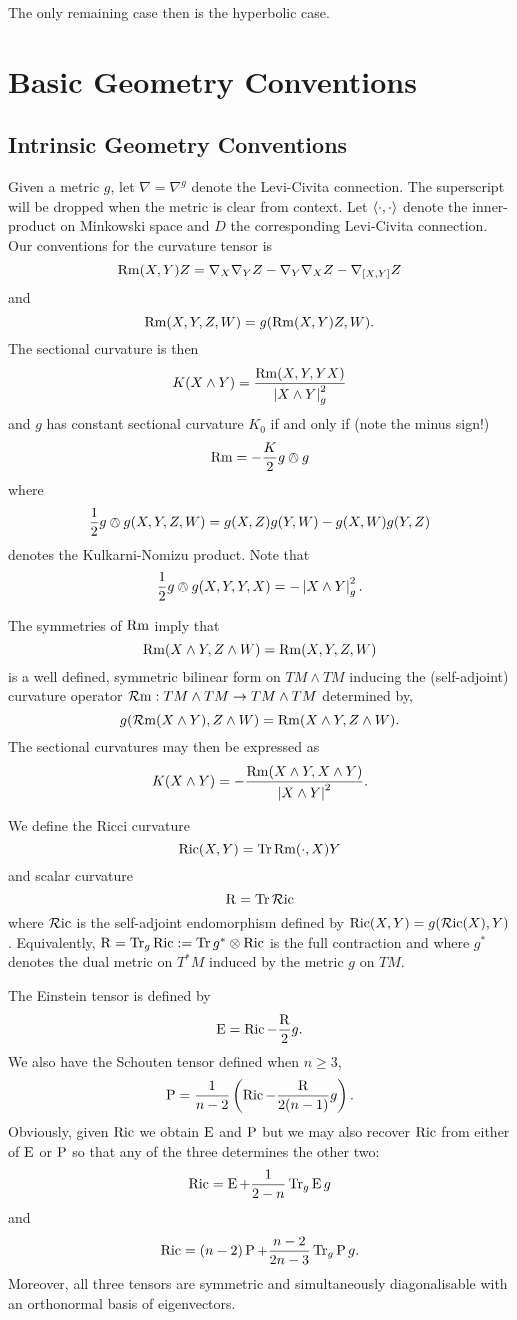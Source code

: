 \documentclass[a4paper, 12pt]{amsart}
\begin{document}
The only remaining case then is the hyperbolic case.

\section{Basic Geometry Conventions}
\label{sec:notation}
\subsection{Intrinsic Geometry Conventions}
\label{subsec:notation_intrinsic}
Given a metric \(g\), let \(\nabla = \nabla^g\) denote the Levi-Civita connection. The superscript will be dropped when the metric is clear from context. Let \(\left\langle \cdot,\cdot \right\rangle\) denote the inner-product on Minkowski space and \(D\) the corresponding Levi-Civita connection. Our conventions for the curvature tensor is
\[
\operatorname{Rm}(X, Y) Z = \nabla_X \nabla_Y Z - \nabla_Y \nabla_X Z - \nabla_{[X, Y]} Z
\]
and
\[
\operatorname{Rm}(X, Y, Z, W) = g(\operatorname{Rm}(X, Y) Z, W).
\]
The sectional curvature is then
\[
K(X \wedge Y) = \frac{\operatorname{Rm}(X, Y, Y X)}{\left\lvert{X \wedge Y}\right\rvert_g^2}
\]
and \(g\) has constant sectional curvature \(K_0\) if and only if (note the minus sign!)
\[
\operatorname{Rm} = -\frac{K}{2} g \owedge g
\]
where
\[
\frac{1}{2} g \owedge g (X, Y, Z, W) = g(X, Z) g (Y, W) - g(X, W) g(Y, Z)
\]
denotes the Kulkarni-Nomizu product. Note that
\[
\frac{1}{2} g \owedge g (X, Y, Y, X) = -\left\lvert{X \wedge Y}\right\rvert_g^2.
\]

The symmetries of \(\operatorname{Rm}\) imply that
\[
\operatorname{Rm}(X\wedge Y, Z \wedge W) = \operatorname{Rm}(X, Y, Z, W)
\]
is a well defined, symmetric bilinear form on \(TM \wedge TM\) inducing the (self-adjoint) curvature operator \(\operatorname{\mathcal{R}m} : TM \wedge TM \to TM \wedge TM\) determined by,
\[
g(\operatorname{\mathcal{R}m}(X\wedge Y), Z \wedge W) = \operatorname{Rm}(X\wedge Y, Z \wedge W).
\]
The sectional curvatures may then be expressed as
\[
K(X \wedge Y) = -\frac{\operatorname{Rm}(X \wedge Y, X \wedge Y)}{\left\lvert{X \wedge Y}\right\rvert^2}.
\]

We define the Ricci curvature
\[
\operatorname{Ric}(X, Y) = \operatorname{Tr} \operatorname{Rm}(\cdot, X) Y
\]
and scalar curvature
\[
\operatorname{R} = \operatorname{Tr} \operatorname{\mathcal{R}ic}
\]
where \(\operatorname{\mathcal{R}ic}\) is the self-adjoint endomorphism defined by \(\operatorname{Ric}(X, Y) = g(\operatorname{\mathcal{R}ic}(X), Y)\). Equivalently, \(\operatorname{R} = \operatorname{Tr}_g \operatorname{Ric} := \operatorname{Tr} g^{\ast} \otimes \operatorname{Ric}\) is the full contraction and where \(g^{\ast}\) denotes the dual metric on \(T^{\ast}M\) induced by the metric \(g\) on \(TM\).

The Einstein tensor is defined by
\[
\operatorname{E} = \operatorname{Ric} - \frac{\operatorname{R}}{2} g.
\]
We also have the Schouten tensor defined when \(n \geq 3\),
\[
\operatorname{P} = \frac{1}{n-2} \left(\operatorname{Ric} - \frac{\operatorname{R}}{2(n-1)}g \right).
\]
Obviously, given \(\operatorname{Ric}\) we obtain \(\operatorname{E}\) and \(\operatorname{P}\) but we may also recover \(\operatorname{Ric}\) from either of \(\operatorname{E}\) or \(\operatorname{P}\) so that any of the three determines the other two:
\[
\operatorname{Ric} = \operatorname{E} + \frac{1}{2-n} \operatorname{Tr}_g \operatorname{E} g
\]
and
\[
\operatorname{Ric} = (n-2) \operatorname{P} + \frac{n-2}{2n-3} \operatorname{Tr}_g \operatorname{P} g.
\]
Moreover, all three tensors are symmetric and simultaneously diagonalisable with an orthonormal basis of eigenvectors.
\end{document}

